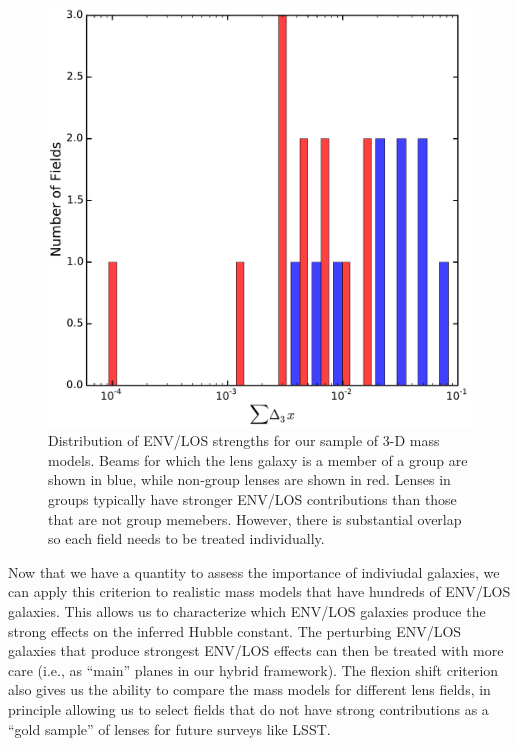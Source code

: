 \documentclass{emulateapj}
\begin{document}
\begin{figure}
\centering
\includegraphics[width=\columnwidth]{d3xsums.pdf}
\caption{Distribution of ENV/LOS strengths for our sample of 3-D mass models. Beams for which the lens galaxy is a member of a group are shown in blue, while non-group lenses are shown in red. Lenses in groups typically have stronger ENV/LOS contributions than those that are not group memebers. However, there is substantial overlap so each field needs to be treated individually.}
\label{fig:d3xsums}
\end{figure}

Now that we have a quantity to assess the importance of indiviudal galaxies, we can apply this criterion to realistic mass models that have hundreds of ENV/LOS galaxies. This allows us to characterize which ENV/LOS galaxies produce the strong effects on the inferred Hubble constant. The perturbing ENV/LOS galaxies that produce strongest ENV/LOS effects can then be treated with more care (i.e., as ``main'' planes in our hybrid framework). The flexion shift criterion also gives us the ability to compare the mass models for different lens fields, in principle allowing us to select fields that do not have strong contributions as a ``gold sample'' of lenses for future surveys like LSST. 
\end{document}
